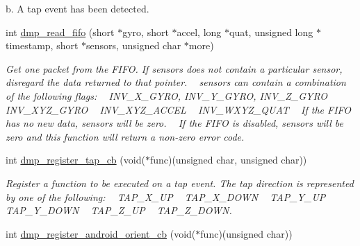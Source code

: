 \begin{DoxyCompactItemize}
\begin{DoxyCompactList}
 b. A tap event has been detected. \end{DoxyCompactList}\item 
int \hyperlink{group___d_r_i_v_e_r_s_ga02db5f25359abe84be002c543cdc3803}{dmp\+\_\+read\+\_\+fifo} (short $\ast$gyro, short $\ast$accel, long $\ast$quat, unsigned long $\ast$timestamp, short $\ast$sensors, unsigned char $\ast$more)
\begin{DoxyCompactList}\small\item\em Get one packet from the F\+I\+FO. If {\itshape sensors} does not contain a particular sensor, disregard the data returned to that pointer. ~\newline
 {\itshape sensors} can contain a combination of the following flags\+: ~\newline
 I\+N\+V\+\_\+\+X\+\_\+\+G\+Y\+RO, I\+N\+V\+\_\+\+Y\+\_\+\+G\+Y\+RO, I\+N\+V\+\_\+\+Z\+\_\+\+G\+Y\+RO ~\newline
 I\+N\+V\+\_\+\+X\+Y\+Z\+\_\+\+G\+Y\+RO ~\newline
 I\+N\+V\+\_\+\+X\+Y\+Z\+\_\+\+A\+C\+C\+EL ~\newline
 I\+N\+V\+\_\+\+W\+X\+Y\+Z\+\_\+\+Q\+U\+AT ~\newline
 If the F\+I\+FO has no new data, {\itshape sensors} will be zero. ~\newline
 If the F\+I\+FO is disabled, {\itshape sensors} will be zero and this function will return a non-\/zero error code. \end{DoxyCompactList}\item 
int \hyperlink{group___d_r_i_v_e_r_s_ga8a2df36126e34b78863e3acf1249d814}{dmp\+\_\+register\+\_\+tap\+\_\+cb} (void($\ast$func)(unsigned char, unsigned char))
\begin{DoxyCompactList}\small\item\em Register a function to be executed on a tap event. The tap direction is represented by one of the following\+: ~\newline
 T\+A\+P\+\_\+\+X\+\_\+\+UP ~\newline
 T\+A\+P\+\_\+\+X\+\_\+\+D\+O\+WN ~\newline
 T\+A\+P\+\_\+\+Y\+\_\+\+UP ~\newline
 T\+A\+P\+\_\+\+Y\+\_\+\+D\+O\+WN ~\newline
 T\+A\+P\+\_\+\+Z\+\_\+\+UP ~\newline
 T\+A\+P\+\_\+\+Z\+\_\+\+D\+O\+WN. \end{DoxyCompactList}\item 
int \hyperlink{group___d_r_i_v_e_r_s_ga2e66a02d29ec89466cf339587592943c}{dmp\+\_\+register\+\_\+android\+\_\+orient\+\_\+cb} (void($\ast$func)(unsigned char))

\end{DoxyCompactItemize}

